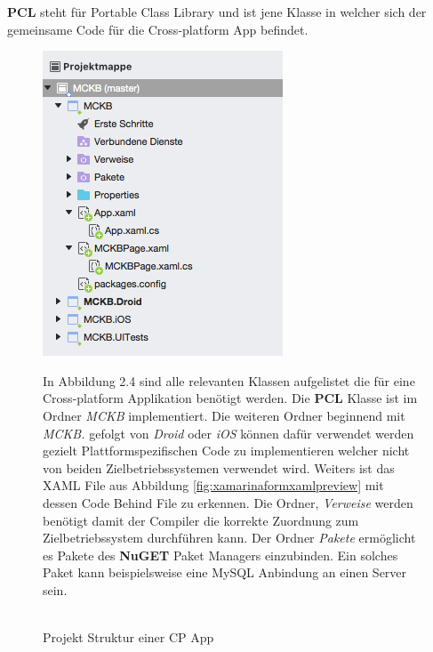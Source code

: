 	\newpage
	\textbf{PCL} steht für Portable Class Library und ist jene Klasse in welcher sich der gemeinsame Code für die Cross-platform App befindet.
	
	\begin{figure}[h!]
		\centering
		\begin{minipage}{.4\textwidth}
			\centering
			\includegraphics[width=.9\textwidth]{images/project-structure.png}
        	\label{fig:xamarinformprojectstructure}
			\caption[Projekt Struktur einer CP App]{\\\hspace{\textwidth}Projekt Struktur einer CP App}
		\end{minipage}
		\begin{minipage}{.5\textwidth}
			In Abbildung 2.4 sind alle relevanten Klassen aufgelistet die für eine Cross-platform Applikation benötigt werden. Die \textbf{PCL} Klasse ist im Ordner \textit{MCKB} implementiert. Die weiteren Ordner beginnend mit \textit{MCKB.} gefolgt von \textit{Droid} oder \textit{iOS} können dafür verwendet werden gezielt Plattformspezifischen Code zu implementieren welcher nicht von beiden Zielbetriebssystemen verwendet wird. 
        	Weiters ist das XAML File aus Abbildung \ref{fig:xamarinaformxamlpreview} mit dessen Code Behind File zu erkennen. Die Ordner, \textit{Verweise} werden benötigt damit der Compiler die korrekte Zuordnung zum Zielbetriebssystem durchführen kann. Der Ordner \textit{Pakete} ermöglicht es Pakete des \textbf{NuGET} Paket Managers einzubinden. Ein solches Paket kann beispielsweise eine MySQL Anbindung an einen Server sein.
        \end{minipage}
	\end{figure}
